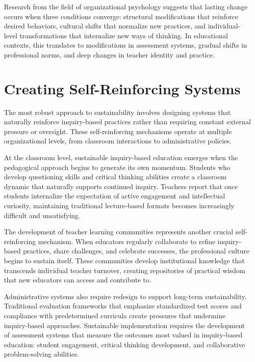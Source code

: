 \documentclass[
  Letterpaper,
]{scrbook}
\begin{document}
Research from the field of organizational psychology suggests that
lasting change occurs when three conditions converge: structural
modifications that reinforce desired behaviors, cultural shifts that
normalize new practices, and individual-level transformations that
internalize new ways of thinking. In educational contexts, this
translates to modifications in assessment systems, gradual shifts in
professional norms, and deep changes in teacher identity and practice.

\section{Creating Self-Reinforcing
Systems}\label{creating-self-reinforcing-systems}

The most robust approach to sustainability involves designing systems
that naturally reinforce inquiry-based practices rather than requiring
constant external pressure or oversight. These self-reinforcing
mechanisms operate at multiple organizational levels, from classroom
interactions to administrative policies.

At the classroom level, sustainable inquiry-based education emerges when
the pedagogical approach begins to generate its own momentum. Students
who develop questioning skills and critical thinking abilities create a
classroom dynamic that naturally supports continued inquiry. Teachers
report that once students internalize the expectation of active
engagement and intellectual curiosity, maintaining traditional
lecture-based formats becomes increasingly difficult and unsatisfying.

The development of teacher learning communities represents another
crucial self-reinforcing mechanism. When educators regularly collaborate
to refine inquiry-based practices, share challenges, and celebrate
successes, the professional culture begins to sustain itself. These
communities develop institutional knowledge that transcends individual
teacher turnover, creating repositories of practical wisdom that new
educators can access and contribute to.

Administrative systems also require redesign to support long-term
sustainability. Traditional evaluation frameworks that emphasize
standardized test scores and compliance with predetermined curricula
create pressures that undermine inquiry-based approaches. Sustainable
implementation requires the development of assessment systems that
measure the outcomes most valued in inquiry-based education: student
engagement, critical thinking development, and collaborative
problem-solving abilities.
\end{document}
